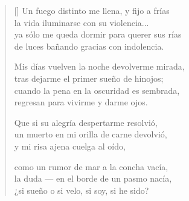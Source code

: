 



\settowidth{\versewidth}{ya sólo me queda dormir para querer sus rías}

\bigskip

\begin{verse}[\versewidth]
  Un fuego distinto me llena, y fijo a frías \\
  la vida iluminarse con su violencia... \\
  ya sólo me queda dormir para querer sus rías \\
  de luces bañando gracias con indolencia.

  Mis días vuelven la noche devolverme mirada, \\
  tras dejarme el primer sueño de hinojos; \\
  cuando la pena en la oscuridad es sembrada, \\
  regresan para vivirme y darme ojos.

  Que si su alegría despertarme resolvió, \\
  un muerto en mi orilla de carne devolvió, \\
  y mi risa ajena cuelga al oído,

  como un rumor de mar a la concha vacía, \\
  la duda --- en el borde de un pasmo nacía, \\
  ¿si sueño o si velo, si soy, si he sido?
\end{verse}

\newpage



\settowidth{\versewidth}{Le doute, --- sur le bord d'une extrême merveille,}

\bigskip

